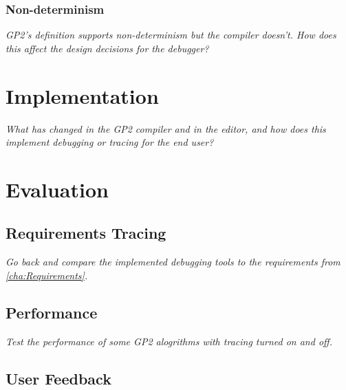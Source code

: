 \documentclass[authoryearcitations]{UoYCSproject}
\begin{document}

\subsection{Non-determinism}
\label{sec:Nondeterminism}

\emph{GP2's definition supports non-determinism but the compiler doesn't. How
does this affect the design decisions for the debugger?}

\clearpage


\chapter{Implementation}
\label{cha:Implementation}

\emph{What has changed in the GP2 compiler and in the editor, and how does this
implement debugging or tracing for the end user?}

\clearpage


\chapter{Evaluation}
\label{cha:Evaluation}

\section{Requirements Tracing}
\label{sec:RequirementsTracing}

\emph{Go back and compare the implemented debugging tools to the requirements
from \autoref{cha:Requirements}.}


\section{Performance}
\label{sec:Performance}

\emph{Test the performance of some GP2 alogrithms with tracing turned on and off.}


\section{User Feedback}
\label{sec:UserFeedback}
\end{document}
